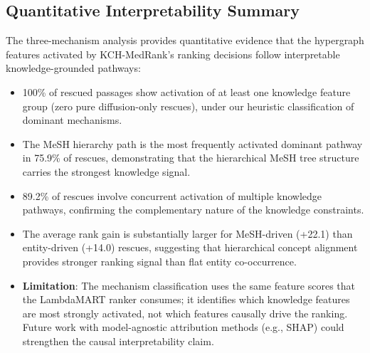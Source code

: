 \subsection{Quantitative Interpretability Summary}

The three-mechanism analysis provides quantitative evidence that the hypergraph features activated by KCH-MedRank's ranking decisions follow interpretable knowledge-grounded pathways:

\begin{itemize}
    \item 100\% of rescued passages show activation of at least one knowledge feature group (zero pure diffusion-only rescues), under our heuristic classification of dominant mechanisms.
    \item The MeSH hierarchy path is the most frequently activated dominant pathway in 75.9\% of rescues, demonstrating that the hierarchical MeSH tree structure carries the strongest knowledge signal.
    \item 89.2\% of rescues involve concurrent activation of multiple knowledge pathways, confirming the complementary nature of the knowledge constraints.
    \item The average rank gain is substantially larger for MeSH-driven (+22.1) than entity-driven (+14.0) rescues, suggesting that hierarchical concept alignment provides stronger ranking signal than flat entity co-occurrence.
    \item \textbf{Limitation}: The mechanism classification uses the same feature scores that the LambdaMART ranker consumes; it identifies which knowledge features are most strongly activated, not which features causally drive the ranking. Future work with model-agnostic attribution methods (e.g., SHAP) could strengthen the causal interpretability claim.
\end{itemize}
